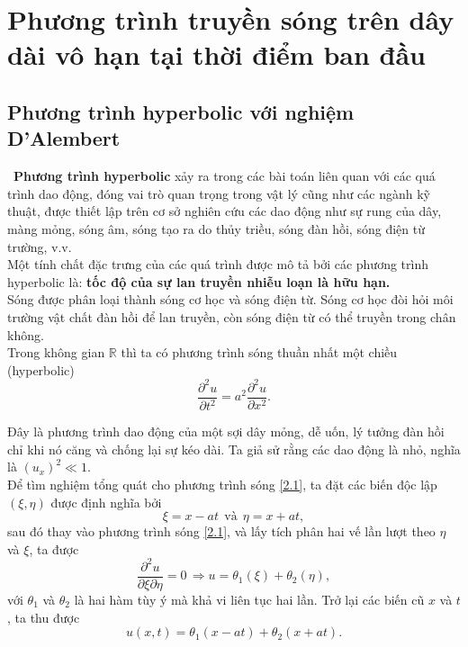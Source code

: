 \documentclass[10pt, a4paper]{article}
\begin{document}
	\section{Phương trình truyền sóng trên dây dài vô hạn tại thời điểm ban đầu}
	\subsection{Phương trình hyperbolic với nghiệm D'Alembert}
	\vspace{1mm}
	\quad\,\,\,\textbf{\color{red}Phương trình hyperbolic} xảy ra trong các bài toán liên quan với các quá trình dao động, đóng vai trò quan trọng trong vật lý cũng như các ngành kỹ thuật, được thiết lập trên cơ sở nghiên cứu các dao động như sự rung của dây, màng mỏng, sóng âm, sóng tạo ra do thủy triều, sóng đàn hồi, sóng điện từ trường, v.v.\\
	
	Một tính chất đặc trưng của các quá trình được mô tả bởi các phương trình hyperbolic là: \textbf{tốc độ của sự lan truyền nhiễu loạn là hữu hạn.}\\
	
	Sóng được phân loại thành sóng cơ học và sóng điện từ. Sóng cơ học đòi hỏi môi trường vật chất đàn hồi để lan truyền, còn sóng điện từ có thể truyền trong chân không.\\
	
	Trong không gian $\mathbb R$ thì ta có phương trình sóng thuần nhất một chiều (hyperbolic) \begin{equation} \tag{2.1} \label{2.1}
		\frac{\partial^2u}{\partial t^2}=a^2\frac{\partial^2u}{\partial x^2}.
	\end{equation}
	
	Đây là phương trình dao động của một sợi dây mỏng, dễ uốn, lý tưởng đàn hồi chỉ khi nó căng và chống lại sự kéo dài. Ta giả sử rằng các dao động là nhỏ, nghĩa là $(u_x)^2\ll1.$\\
	
	Để tìm nghiệm tổng quát cho phương trình sóng \eqref{2.1}, ta đặt các biến độc lập $(\xi,\eta)$ được định nghĩa bởi $$\xi=x-at~~\text{và}~~\eta=x+at,$$
	sau đó thay vào phương trình sóng \eqref{2.1}, và lấy tích phân hai vế lần lượt theo $\eta$ và $\xi$, ta được $$\frac{\partial^2u}{\partial\xi\partial\eta}=0\,\Longrightarrow u=\theta_1(\xi)+\theta_2(\eta),$$
	với $\theta_1$ và $\theta_2$ là hai hàm tùy ý mà khả vi liên tục hai lần. Trở lại các biến cũ $x$ và $t$, ta thu được \begin{equation} \tag{2.2} \label{2.2}
		u(x,t)=\theta_1(x-at)+\theta_2(x+at).
	\end{equation}
	
\end{document}
